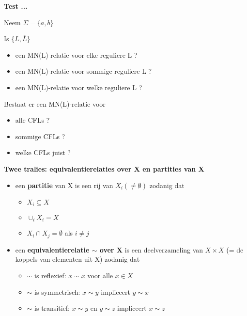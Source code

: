 \documentclass{seminar}
\newcommand{\openpagina}{}
\begin{document}
\begin{slide}
{\bf Test ...}

Neem $\Sigma = \{a,b\}$

Is $\{L, \overline{L}\}$ 
\begin{itemize}
\item 
een MN(L)-relatie voor elke reguliere L ?
\item 
een MN(L)-relatie voor sommige reguliere L ?
\item 
een MN(L)-relatie voor welke reguliere L ? 
\end{itemize}

Bestaat er een MN(L)-relatie voor 
\begin{itemize}
\item alle CFLs ?
\item sommige CFLs ?
\item welke CFLs juist ?
\end{itemize}


\end{slide} \openpagina


\begin{slide}
{\bf Twee tralies: equivalentierelaties over X en partities van X}

\begin{itemize}
\item 
een {\bf partitie} van X is een rij van $X_i (\neq \emptyset)$ zodanig dat
\begin{itemize}
\item 
$X_i \subseteq X$
\item 
$\cup_i X_i = X$
\item 
$X_i \cap X_j = \emptyset$ als $i \neq j$
\end{itemize}

\item 
een {\bf equivalentierelatie $\sim$ over X} is een deelverzameling van
$X \times X$ (= de koppels van elementen uit X) zodanig dat
\begin{itemize}
\item 
$\sim$ is reflexief: $x \sim x$ voor alle $x \in X$
\item 
$\sim$ is symmetrisch: $x \sim y$ impliceert $y \sim x$

\item 
$\sim$ is transitief: $x \sim y$ en $y \sim z$ impliceert $x \sim z$

\end{itemize}


\end{itemize}
\end{slide} \openpagina
\end{document}
